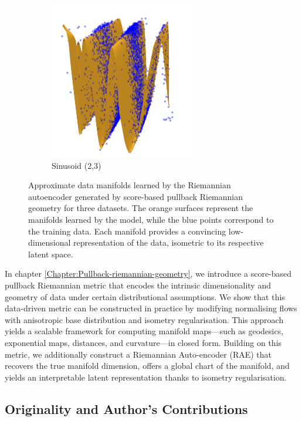 \begin{figure}[h]
\begin{subfigure}[b]{0.32\textwidth}
        \centering
        \includegraphics[width=0.7\textwidth]{Outline/figures/score-based-riemannian-geometry/sinusoid_2_3.jpg}
        \caption{Sinusoid (2,3)}
    \end{subfigure}

    \caption{
        Approximate data manifolds learned by the Riemannian autoencoder generated by score-based pullback Riemannian geometry for three datasets. The orange surfaces represent the manifolds learned by the model, while the blue points correspond to the training data. Each manifold provides a convincing low-dimensional representation of the data, isometric to its respective latent space.
    }
    \label{fig:learned_charts}
\end{figure}

In chapter \ref{Chapter:Pullback-riemannian-geometry}, we introduce a score-based pullback Riemannian metric that encodes the intrinsic dimensionality and geometry of data under certain distributional assumptions. We show that this data-driven metric can be constructed in practice by modifying normalising flows with anisotropic base distribution and isometry regularisation. This approach yields a scalable framework for computing manifold maps—such as geodesics, exponential maps, distances, and curvature—in closed form. Building on this metric, we additionally construct a Riemannian Auto-encoder (RAE) that recovers the true manifold dimension, offers a global chart of the manifold, and yields an interpretable latent representation thanks to isometry regularisation.

\subsection*{Originality and Author’s Contributions}

